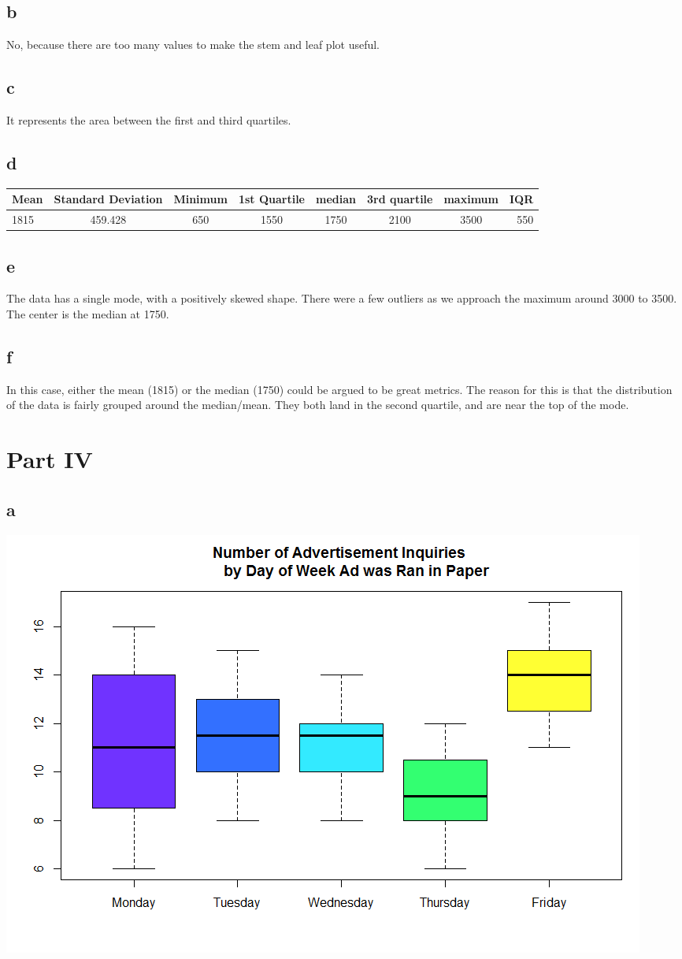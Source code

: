 \documentclass[10pt,letterpaper]{article}
\begin{document}
\subsection*{b}
No, because there are too many values to make the stem and leaf plot useful.
\subsection*{c}
It represents the area between the first and third quartiles.
\subsection*{d}
\begin{tabular}{ l | c | c | c | c | c | c | r }
	Mean & Standard Deviation & Minimum & 1st Quartile & median & 3rd quartile & maximum & IQR\\ \hline
	1815 & 459.428 & 650 & 1550 & 1750 & 2100 & 3500  & 550 
\end{tabular}
\subsection*{e}
The data has a single mode, with a positively skewed shape. There were a few
outliers as we approach the maximum around 3000 to 3500. The center is the
median at 1750.
\subsection*{f}
In this case, either the mean (1815) or the median (1750) could be argued to be
great metrics. The reason for this is that the distribution of the data is
fairly grouped around the median/mean. They both land in the second quartile,
and are near the top of the mode. 
\section*{Part IV}
\subsection*{a}
\includegraphics[scale=.5]{colorbox}
\end{document}
